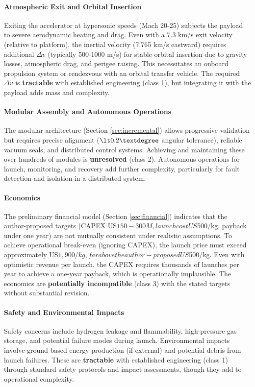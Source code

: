 \paragraph{Atmospheric Exit and Orbital Insertion}
Exiting the accelerator at hypersonic speeds (Mach 20-25) subjects the payload to severe aerodynamic heating and drag. Even with a 7.3 km/s exit velocity (relative to platform), the inertial velocity (7.765 km/s eastward) requires additional $\Delta v$ (typically 500-1000 m/s) for stable orbital insertion due to gravity losses, atmospheric drag, and perigee raising. This necessitates an onboard propulsion system or rendezvous with an orbital transfer vehicle. The required $\Delta v$ is \textbf{tractable} with established engineering (class 1), but integrating it with the payload adds mass and complexity.

\paragraph{Modular Assembly and Autonomous Operations}
The modular architecture (Section \ref{sec:incremental}) allows progressive validation but requires precise alignment ($\lt 0.2\textdegree$ angular tolerance), reliable vacuum seals, and distributed control systems. Achieving and maintaining these over hundreds of modules is \textbf{unresolved} (class 2). Autonomous operations for launch, monitoring, and recovery add further complexity, particularly for fault detection and isolation in a distributed system.

\paragraph{Economics}
The preliminary financial model (Section \ref{sec:financial}) indicates that the author-proposed targets (CAPEX US$150-300M, launch cost US$500/kg, payback under one year) are not mutually consistent under realistic assumptions. To achieve operational break-even (ignoring CAPEX), the launch price must exceed approximately US$1,900/kg, far above the author-proposed US$500/kg. Even with optimistic revenue per launch, the CAPEX requires thousands of launches per year to achieve a one-year payback, which is operationally implausible. The economics are \textbf{potentially incompatible} (class 3) with the stated targets without substantial revision.

\paragraph{Safety and Environmental Impacts}
Safety concerns include hydrogen leakage and flammability, high-pressure gas storage, and potential failure modes during launch. Environmental impacts involve ground-based energy production (if external) and potential debris from launch failures. These are \textbf{tractable} with established engineering (class 1) through standard safety protocols and impact assessments, though they add to operational complexity.

